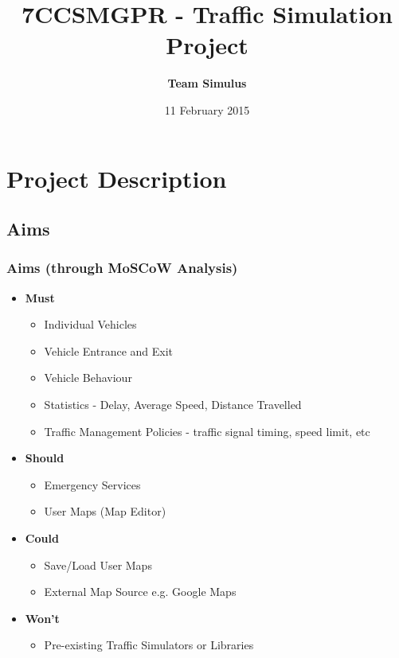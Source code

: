 \documentclass{beamer}
\title[Welcome]{7CCSMGPR - Traffic Simulation Project} %
\author{\textbf{Team Simulus}} %
\institute[KCL] %
{
King's College London \\ %
\medskip
\textit{https://github.com/leorohr/simulus} %
}
\date{11 February 2015} %
\begin{document}
\begin{frame}
\titlepage %
\end{frame}



\section{Project Description} %

\subsection{Aims} %

\begin{frame}
\frametitle{Aims (through MoSCoW Analysis)}

\begin{itemize}
\item \textbf{Must}
	\begin{itemize}
		\item Individual Vehicles
		\item Vehicle Entrance and Exit 
		\item Vehicle Behaviour
		\item Statistics - Delay, Average Speed, Distance Travelled
		\item Traffic Management Policies - traffic signal timing, speed limit, etc
\end{itemize}

\item \textbf{Should}
	\begin{itemize}
		\item Emergency Services
		\item User Maps (Map Editor)
	\end{itemize}
\item \textbf{Could}
	\begin{itemize}
		\item Save/Load User Maps
		\item External Map Source e.g. Google Maps
		\end{itemize}
\item \textbf{Won't}
	\begin{itemize}
		\item Pre-existing Traffic Simulators or Libraries
	\end{itemize}	
\end{itemize}

\end{frame}
\end{document}
